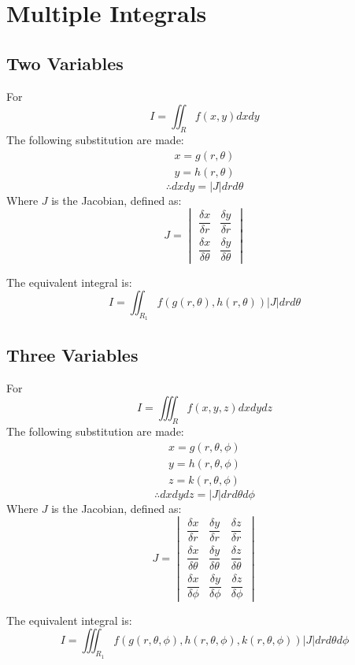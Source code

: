 \chapter{Multiple Integrals}
\section{Two Variables}
For
\begin{equation}
	I=\iint_R f(x,y) dxdy
\end{equation}
The following substitution are made:
\begin{align}
	x=g(r,\theta)\\
	y=h(r,\theta)
\end{align}
\begin{equation}
	\therefore dx dy=\lvert J \rvert dr d\theta
\end{equation}
Where $J$ is the Jacobian, defined as:
\begin{equation}
	J=\begin{vmatrix}
		\dfrac{\delta x}{\delta r}&\dfrac{\delta y}{\delta r}\\
		\dfrac{\delta x}{\delta \theta}&\dfrac{\delta y}{\delta \theta}
	\end{vmatrix}
\end{equation}

The equivalent integral is:
\begin{equation}
	I=\iint_{R_1} f(g(r,\theta),h(r,\theta))\lvert J \rvert drd\theta
\end{equation}


\section{Three Variables}
For
\begin{equation}
	I=\iiint_R f(x,y,z) dxdydz
\end{equation}
The following substitution are made:
\begin{align}
	x=g(r,\theta,\phi)\\
	y=h(r,\theta,\phi)\\
	z=k(r,\theta,\phi)
\end{align}
\begin{equation}
	\therefore dx dy dz=\lvert J \rvert dr d\theta d\phi
\end{equation}
Where $J$ is the Jacobian, defined as:
\begin{equation}
	J=\begin{vmatrix}
		\dfrac{\delta x}{\delta r}&\dfrac{\delta y}{\delta r}&\dfrac{\delta z}{\delta r}\\
		\dfrac{\delta x}{\delta \theta}&\dfrac{\delta y}{\delta \theta}&\dfrac{\delta z}{\delta \theta}\\
		\dfrac{\delta x}{\delta \phi}&\dfrac{\delta y}{\delta \phi}&\dfrac{\delta z}{\delta \phi}
	\end{vmatrix}
\end{equation}

The equivalent integral is:
\begin{equation}
	I=\iiint_{R_1} f(g(r,\theta,\phi),h(r,\theta,\phi),k(r,\theta,\phi))\lvert J \rvert dr d\theta d\phi
\end{equation}

